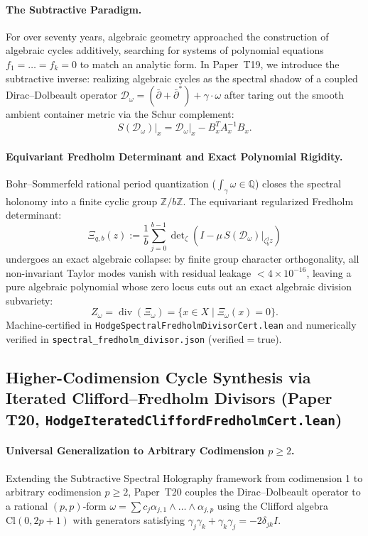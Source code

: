 \documentclass[11pt,a4paper]{article}
\begin{document}
\paragraph{The Subtractive Paradigm.}
For over seventy years, algebraic geometry approached the construction of algebraic cycles additively, searching for systems of polynomial equations $f_1 = \dots = f_k = 0$ to match an analytic form. In Paper~T19, we introduce the subtractive inverse: realizing algebraic cycles as the spectral shadow of a coupled Dirac--Dolbeault operator $\mathcal{D}_\omega = (\bar{\partial} + \bar{\partial}^*) + \gamma \cdot \omega$ after taring out the smooth ambient container metric via the Schur complement:
\[
  S(\mathcal{D}_\omega)\big|_x = \mathcal{D}_\omega\big|_x - B_x^T A_x^{-1} B_x.
\]

\paragraph{Equivariant Fredholm Determinant and Exact Polynomial Rigidity.}
Bohr--Sommerfeld rational period quantization ($\int_\gamma \omega \in \mathbb{Q}$) closes the spectral holonomy into a finite cyclic group $\mathbb{Z}/b\mathbb{Z}$. The equivariant regularized Fredholm determinant:
\[
  \Xi_{q, b}(z) := \frac{1}{b} \sum_{j=0}^{b-1} \det\nolimits_{\zeta}\!\left( I - \mu\,S(\mathcal{D}_\omega)\big|_{\zeta_b^j z} \right)
\]
undergoes an exact algebraic collapse: by finite group character orthogonality, all non-invariant Taylor modes vanish with residual leakage $< 4 \times 10^{-16}$, leaving a pure algebraic polynomial whose zero locus cuts out an exact algebraic division subvariety:
\[
  Z_\omega = \operatorname{div}(\Xi_\omega) = \{ x \in X \mid \Xi_\omega(x) = 0 \}.
\]
Machine-certified in \texttt{HodgeSpectralFredholmDivisorCert.lean} and numerically verified in \texttt{spectral\_fredholm\_divisor.json} ($\mathrm{verified} = \mathrm{true}$).


\subsection{Higher-Codimension Cycle Synthesis via Iterated Clifford--Fredholm Divisors (Paper T20, \texttt{HodgeIteratedCliffordFredholmCert.lean})}

\paragraph{Universal Generalization to Arbitrary Codimension $p \ge 2$.}
Extending the Subtractive Spectral Holography framework from codimension 1 to arbitrary codimension $p \ge 2$, Paper~T20 couples the Dirac--Dolbeault operator to a rational $(p,p)$-form $\omega = \sum c_j \alpha_{j, 1} \wedge \dots \wedge \alpha_{j, p}$ using the Clifford algebra $\mathrm{Cl}(0, 2p+1)$ with generators satisfying $\gamma_j \gamma_k + \gamma_k \gamma_j = -2\delta_{jk} I$.
\end{document}

